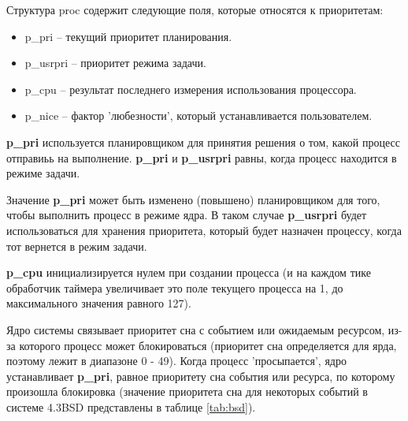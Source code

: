 Структура proc содержит следующие поля, которые относятся к приоритетам:
\begin{itemize}
	\item p\_pri -- текущий приоритет планирования.
	\item p\_usrpri -- приоритет режима задачи.
	\item p\_cpu -- результат последнего измерения использования процессора.
	\item p\_nice -- фактор 'любезности', который устанавливается пользователем.
\end{itemize}

\textbf{p\_pri} используется планировщиком для принятия решения о том, какой процесс отправиьь на выполнение. \textbf{p\_pri} и \textbf{p\_usrpri} равны, когда процесс находится в режиме задачи. 

Значение \textbf{p\_pri} может быть изменено (повышено) планировщиком для того, чтобы выполнить процесс в режиме ядра. В таком случае \textbf{p\_usrpri} будет использоваться для хранения приоритета, который будет назначен процессу, когда тот вернется в режим задачи.

\textbf{p\_cpu} инициализируется нулем при создании процесса (и на каждом тике обработчик таймера увеличивает это поле текущего процесса на 1, до максимального значения равного 127).

Ядро системы связывает приоритет сна с событием или ожидаемым ресурсом, из-за которого процесс может блокироваться (приоритет сна определяется для ярда, поэтому лежит в диапазоне 0 - 49). Когда процесс 'просыпается', ядро устанавливает \textbf{p\_pri}, равное приоритету сна события или ресурса, по которому произошла блокировка (значение приоритета сна для некоторых событий в системе 4.3BSD представлены в таблице \ref{tab:bsd}).

